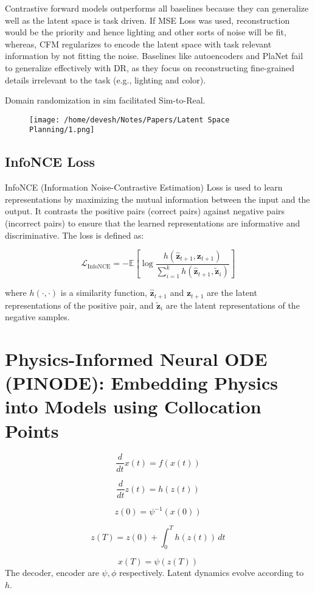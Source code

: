 \documentclass[12pt]{article}
\begin{document}
Contrastive forward models outperforms all baselines because they can generalize well as the latent space is task driven. If MSE Loss was used, reconstruction would be the priority and hence lighting and other sorts of noise will be fit, whereas, CFM regularizes to encode the latent space with task relevant information by not fitting the noise. Baselines like autoencoders and PlaNet fail to generalize effectively with DR, as they focus on reconstructing fine-grained details irrelevant to the task (e.g., lighting and color).

Domain randomization in sim facilitated Sim-to-Real.
\begin{figure}[ht]
    \centering
    \texttt{[image: /home/devesh/Notes/Papers/Latent Space Planning/1.png]}
    \caption{}
    \label{fig:latent_dynamics}
\end{figure}

\subsection{InfoNCE Loss}
InfoNCE (Information Noise-Contrastive Estimation) Loss is used to learn representations by maximizing the mutual information between the input and the output. It contrasts the positive pairs (correct pairs) against negative pairs (incorrect pairs) to ensure that the learned representations are informative and discriminative. The loss is defined as:

\[
\mathcal{L}_{\text{InfoNCE}} = -\mathbb{E} \left[ \log \frac{h(\hat{\mathbf{z}}_{t+1}, \mathbf{z}_{t+1})}{\sum_{i=1}^{k} h(\hat{\mathbf{z}}_{t+1}, \tilde{\mathbf{z}}_i)} \right]
\]

where \(h(\cdot, \cdot)\) is a similarity function, \(\hat{\mathbf{z}}_{t+1}\) and \(\mathbf{z}_{t+1}\) are the latent representations of the positive pair, and \(\tilde{\mathbf{z}}_i\) are the latent representations of the negative samples.

\newpage
\section{Physics-Informed Neural ODE (PINODE): Embedding Physics into Models using Collocation Points}
\begin{multicols}{2}
\[
\frac{d}{dt} x(t) = f(x(t))
\]

\[
\frac{d}{dt} z(t) = h(z(t))
\]

\[
z(0) = \psi^{-1}(x(0))
\]

\[
z(T) = z(0) + \int_{0}^{T} h(z(t)) \, dt
\]

\[
x(T) = \psi(z(T))
\]
The decoder, encoder are \(\psi , \phi\) respectively. Latent dynamics evolve according to \(h\).
\end{multicols}
\end{document}
